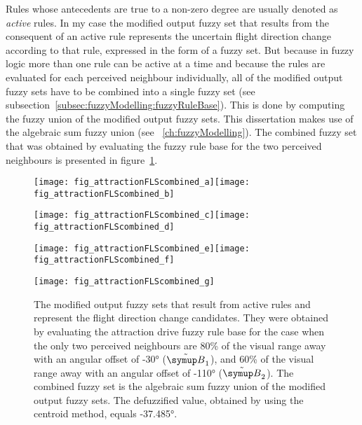 Rules whose antecedents are true to a non-zero degree are usually denoted as \emph{active} rules. In my case the modified output fuzzy set that results from the consequent of an active rule represents the uncertain flight direction change according to that rule, expressed in the form of a fuzzy set. But because in fuzzy logic more than one rule can be active at a time and because the rules are evaluated for each perceived neighbour individually, all of the modified output fuzzy sets have to be combined into a single fuzzy set (see subsection~\ref{subsec:fuzzyModelling:fuzzyRuleBase}). This is done by computing the fuzzy union of the modified output fuzzy sets. This dissertation makes use of the algebraic sum fuzzy union (see \chaptername~\ref{ch:fuzzyModelling}). The combined fuzzy set that was obtained by evaluating the fuzzy rule base for the two perceived neighbours is presented in figure~\ref{fig:attraction:FLS:combined}.

\begin{figure}
  \null\vspace*{2mm}
  \texttt{[image: fig\_attractionFLScombined\_a]}\hspace*{2mm}\texttt{[image: fig\_attractionFLScombined\_b]}
  \par\vspace*{2mm}
  \texttt{[image: fig\_attractionFLScombined\_c]}\hspace*{2mm}\texttt{[image: fig\_attractionFLScombined\_d]}
  \par\vspace*{2mm}
  \texttt{[image: fig\_attractionFLScombined\_e]}\hspace*{2mm}\texttt{[image: fig\_attractionFLScombined\_f]}
  \par\vspace*{2mm}
  \texttt{[image: fig\_attractionFLScombined\_g]}
  \par\vspace*{2mm}
  \caption{The modified output fuzzy sets that result from active rules and represent the flight direction change candidates. They were obtained by evaluating the attraction drive fuzzy rule base for the case when the only two perceived neighbours are 80\% of the visual range away with an angular offset of \ang{-30} ($\fautom{B}_1$), and 60\% of the visual range away with an angular offset of \ang{-110} ($\fautom{B}_2$). The combined fuzzy set is the algebraic sum fuzzy union of the modified output fuzzy sets. The defuzzified value, obtained by using the centroid method, equals \ang{-37.485}.}
  \label{fig:attraction:FLS:combined}
\end{figure}

